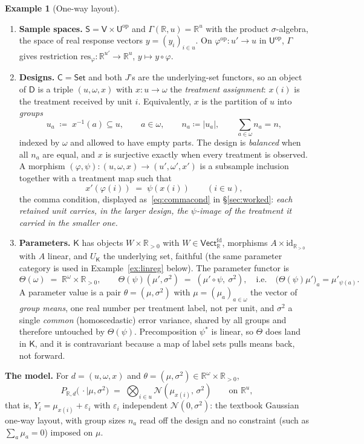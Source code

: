 \documentclass[11pt,a4paper]{article}
\theoremstyle{plain}
\theoremstyle{definition}
\newtheorem{example}[theorem]{Example}
\theoremstyle{remark}
\newcommand{\cat}[1]{\mathsf{#1}}
\newcommand{\catU}{\cat{U}}
\newcommand{\catV}{\cat{V}}
\newcommand{\catS}{\cat{S}}
\newcommand{\catD}{\cat{D}}
\newcommand{\catK}{\cat{K}}
\newcommand{\Set}{\cat{Set}}
\newcommand{\op}{\mathrm{op}}
\newcommand{\id}{\mathrm{id}}
\newcommand{\R}{\mathbb{R}}
\newcommand{\Vect}{\cat{Vect}}
\newcommand{\Norm}{\mathcal{N}}
\newcommand{\res}{\mathrm{res}}
\begin{document}
\begin{example}[One-way layout]
\begin{enumerate}
\item \textbf{Sample spaces.} $\catS = \catV \times \catU^{\op}$ and
$\Gamma(\R,u) = \R^{u}$ with the product $\sigma$-algebra, the space of real
response vectors $y = (y_i)_{i \in u}$. On $\varphi^{\op} \colon u' \to u$ in
$\catU^{\op}$, $\Gamma$ gives restriction $\res_{\varphi} \colon \R^{u'} \to
\R^{u}$, $y \mapsto y \circ \varphi$.

\item \textbf{Designs.} $\cat{C} = \Set$ and both $J$'s are the
underlying-set functors, so an object of $\catD$ is a triple $(u,\omega,x)$
with $x \colon u \to \omega$ the \emph{treatment assignment}: $x(i)$ is the
treatment received by unit $i$. Equivalently, $x$ is the partition of $u$ into
\emph{groups}
\[
u_a \;\coloneqq\; x^{-1}(a) \subseteq u, \qquad a \in \omega,
\qquad n_a \coloneqq |u_a|, \qquad \textstyle\sum_{a \in \omega} n_a = n,
\]
indexed by $\omega$ and allowed to have empty parts. The design is
\emph{balanced} when all $n_a$ are equal, and $x$ is surjective exactly when
every treatment is observed. A morphism $(\varphi,\psi) \colon
(u,\omega,x) \to (u',\omega',x')$ is a subsample inclusion together with a
treatment map such that
\[
x'(\varphi(i)) \;=\; \psi(x(i)) \qquad (i \in u),
\]
the comma condition, displayed as~\eqref{eq:commacond} in \S\ref{sec:worked}:
\emph{each retained unit carries, in the larger design, the $\psi$-image of
the treatment it carried in the smaller one.}

\item \textbf{Parameters.} $\catK$ has objects
$W \times \R_{>0}$ with $W \in \Vect_{\R}^{\mathrm{fd}}$, morphisms
$A \times \id_{\R_{>0}}$ with $A$ linear, and $U_{\catK}$ the underlying set,
faithful (the same parameter category is used in Example~\ref{ex:linreg}
below). The parameter functor is
\[
\Theta(\omega) \;=\; \R^{\omega} \times \R_{>0},
\qquad
\Theta(\psi)(\mu',\sigma^{2}) \;=\; (\mu' \circ \psi,\ \sigma^{2}),
\quad\text{i.e.}\quad
\bigl(\Theta(\psi)\mu'\bigr)_{a} = \mu'_{\psi(a)} .
\]
A parameter value is a pair $\theta = (\mu,\sigma^{2})$ with $\mu =
(\mu_a)_{a \in \omega}$ the vector of \emph{group means}, one real number
per treatment label, not per unit, and $\sigma^{2}$ a single
\emph{common} (homoscedastic) error variance, shared by all groups and
therefore untouched by $\Theta(\psi)$. Precomposition $\psi^{*}$ is linear, so
$\Theta$ does land in $\catK$, and it is contravariant because a map of label
sets pulls means back, not forward.
\end{enumerate}

\noindent\textbf{The model.} For $d = (u,\omega,x)$ and $\theta =
(\mu,\sigma^{2}) \in \R^{\omega} \times \R_{>0}$,
\[
P_{\R,d}\bigl(\,\cdot \mid \mu,\sigma^{2}\bigr)
\;=\; \bigotimes_{i \in u} \Norm(\mu_{x(i)},\,\sigma^{2})
\qquad \text{on } \R^{u},
\]
that is, $Y_i = \mu_{x(i)} + \varepsilon_i$ with $\varepsilon_i$ independent
$\Norm(0,\sigma^{2})$: the textbook Gaussian one-way layout, with group sizes
$n_a$ read off the design and no constraint (such as $\sum_a \mu_a = 0$)
imposed on $\mu$.
\end{example}
\end{document}
